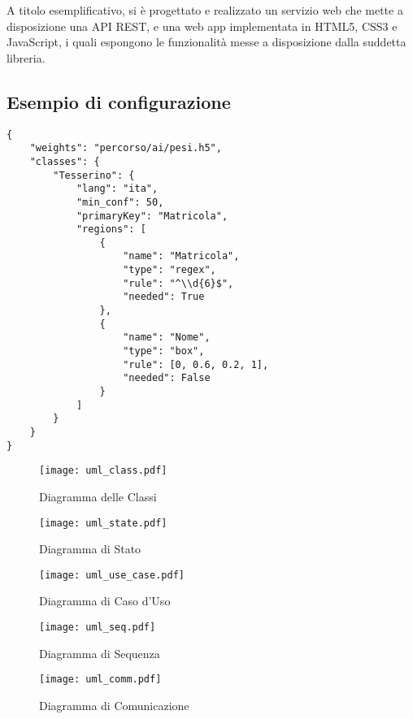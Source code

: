 \documentclass[12pt,a4paper]{article}
\begin{document}
A titolo esemplificativo, si è progettato e realizzato un servizio web
che mette a disposizione una API REST, e una web app implementata in
HTML5, CSS3 e JavaScript, i quali espongono le funzionalità messe a
disposizione dalla suddetta libreria.

\pagebreak

\subsection{Esempio di configurazione}
\begin{verbatim}
{
    "weights": "percorso/ai/pesi.h5",
    "classes": {
        "Tesserino": {
            "lang": "ita",
            "min_conf": 50,
            "primaryKey": "Matricola",
            "regions": [
                {
                    "name": "Matricola",
                    "type": "regex",
                    "rule": "^\\d{6}$",
                    "needed": True
                },
                {
                    "name": "Nome",
                    "type": "box",
                    "rule": [0, 0.6, 0.2, 1],
                    "needed": False
                }
            ]
        }
    }
}
\end{verbatim}

\begin{figure}[p]
  \caption{Diagramma delle Classi}
  \centering
  \texttt{[image: uml\_class.pdf]}
\end{figure}

\begin{figure}[p]
  \caption{Diagramma di Stato}
  \centering
  \texttt{[image: uml\_state.pdf]}
\end{figure}

\begin{figure}[p]
  \caption{Diagramma di Caso d'Uso}
  \centering
  \texttt{[image: uml\_use\_case.pdf]}
\end{figure}

\begin{figure}[p]
  \caption{Diagramma di Sequenza}
  \centering
  \texttt{[image: uml\_seq.pdf]}
\end{figure}

\begin{figure}[p]
  \caption{Diagramma di Comunicazione}
  \centering
  \texttt{[image: uml\_comm.pdf]}
\end{figure}
\end{document}
